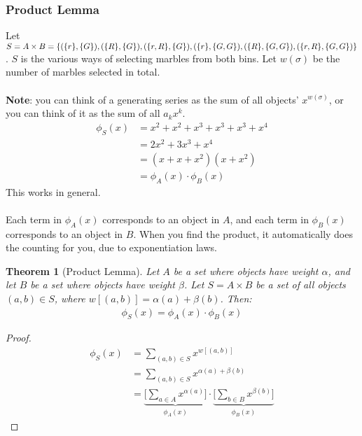 \documentclass[]{article}
\newtheorem*{theorem}{Theorem}
\theoremstyle{definition}
\newcommand{\lecture}[1]{\marginpar{{\footnotesize $\leftarrow$ \underline{#1}}}}
\DeclarePairedDelimiter{\set}{\lbrace}{\rbrace}
\begin{document}
			\subsubsection{Product Lemma} \lecture{January 18, 2013}
				Let $S = A \times B = \set{(\set{r}, \set{G}), (\set{R}, \set{G}), (\set{r, R}, \set{G}), (\set{r}, \set{G, G}), (\set{R}, \set{G, G}), (\set{r, R}, \set{G, G}) }$. $S$ is the various ways of selecting marbles from both bins. Let $w(\sigma)$ be the number of marbles selected in total.
				\\ \\
				\textbf{Note}: you can think of a generating series as the sum of all objects' $x^{w(\sigma)}$, or you can think of it as the sum of all $a_k x^k$.
				\begin{align*}
					\phi_S(x) &= x^2 + x^2 + x^3 + x^3 + x^3 + x^4 \\
					&= 2x^2 + 3x^3 + x^4 \\
					&= (x + x + x^2)(x + x^2) \\
					&= \phi_A(x) \cdot \phi_B(x)
				\end{align*}
				This works in general.
				\\ \\
				Each term in $\phi_A(x)$ corresponds to an object in $A$, and each term in $\phi_B(x)$ corresponds to an object in $B$. When you find the product, it automatically does the counting for you, due to exponentiation laws.
				\begin{theorem}[Product Lemma]
					Let $A$ be a set where objects have weight $\alpha$, and let $B$ be a set where objects have weight $\beta$. Let $S = A \times B$ be a set of all objects $(a, b) \in S$, where $w[(a, b)] = \alpha(a) + \beta(b)$. Then:
					\begin{align*}
						\phi_S(x) = \phi_A(x) \cdot \phi_B(x)
					\end{align*}
				\end{theorem}

				\begin{proof}
					\begin{align*}
						\phi_S(x) &= \sum_{(a, b) \in S} x^{w[(a, b)]} \\
						&= \sum_{(a, b) \in S} x^{\alpha(a) + \beta(b)} \\
						&= \underbrace{\bigg[ \sum_{a \in A} x^{\alpha(a)} \bigg]}_{\phi_A(x)} \cdot \underbrace{\bigg[ \sum_{b \in B} x^{\beta(b)} \bigg]}_{\phi_B(x)}
					\end{align*}
				\end{proof}
\end{document}
